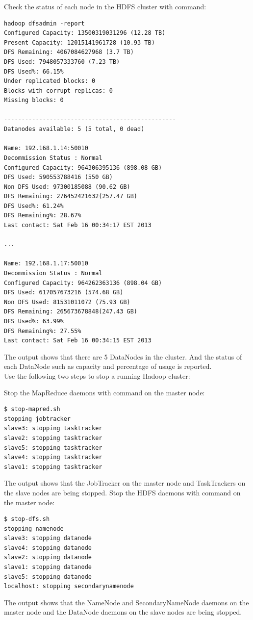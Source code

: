 Check the status of each node in the HDFS cluster with command:
\begin{verbatim}
hadoop dfsadmin -report
Configured Capacity: 13500319031296 (12.28 TB)
Present Capacity: 12015141961728 (10.93 TB)
DFS Remaining: 4067084627968 (3.7 TB)
DFS Used: 7948057333760 (7.23 TB)
DFS Used%: 66.15%
Under replicated blocks: 0
Blocks with corrupt replicas: 0
Missing blocks: 0

-------------------------------------------------
Datanodes available: 5 (5 total, 0 dead)

Name: 192.168.1.14:50010
Decommission Status : Normal
Configured Capacity: 964306395136 (898.08 GB)
DFS Used: 590553788416 (550 GB)
Non DFS Used: 97300185088 (90.62 GB)
DFS Remaining: 276452421632(257.47 GB)
DFS Used%: 61.24%
DFS Remaining%: 28.67%
Last contact: Sat Feb 16 00:34:17 EST 2013

...

Name: 192.168.1.17:50010
Decommission Status : Normal
Configured Capacity: 964262363136 (898.04 GB)
DFS Used: 617057673216 (574.68 GB)
Non DFS Used: 81531011072 (75.93 GB)
DFS Remaining: 265673678848(247.43 GB)
DFS Used%: 63.99%
DFS Remaining%: 27.55%
Last contact: Sat Feb 16 00:34:15 EST 2013

\end{verbatim}

The output shows that there are 5 DataNodes in the cluster. And the status of each DataNode such as capacity and percentage of usage is reported. \\
Use the following two steps to stop a running Hadoop cluster:

Stop the MapReduce daemons with command on the master node:
\begin{verbatim}
$ stop-mapred.sh
stopping jobtracker
slave3: stopping tasktracker
slave2: stopping tasktracker
slave5: stopping tasktracker
slave4: stopping tasktracker
slave1: stopping tasktracker
\end{verbatim}

The output shows that the JobTracker on the master node and TaskTrackers on the slave nodes are being stopped.
Stop the HDFS daemons with command on the master node:
\begin{verbatim}
$ stop-dfs.sh
stopping namenode
slave3: stopping datanode
slave4: stopping datanode
slave2: stopping datanode
slave1: stopping datanode
slave5: stopping datanode
localhost: stopping secondarynamenode
\end{verbatim}

The output shows that the NameNode and SecondaryNameNode daemons on the master node and the DataNode daemons on the slave nodes are being stopped.

